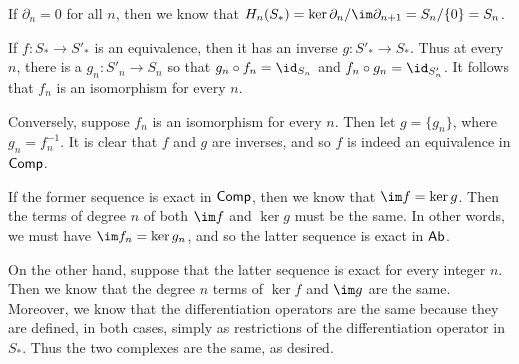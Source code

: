 \documentclass[../../solutions.tex]{subfiles}
\begin{document}
\begin{exercise} \leavevmode
If $\partial_n=0$ for all $n$, then we know that $H_n(S_*)=\ker\partial_n/\im\partial_{n+1}=S_n/\{0\}=S_n$. 
\end{exercise}

\begin{exercise} \leavevmode
If $f:S_*\to S'_*$ is an equivalence, then it has an inverse $g:S'_*\to S_*$. 
Thus at every $n$, there is a $g_n:S'_n\to S_n$ so that $g_n\circ f_n=\id_{S_n}$ and $f_n\circ g_n=\id_{S'_n}$. 
It follows that $f_n$ is an isomorphism for every $n$. 

Conversely, suppose $f_n$ is an isomorphism for every $n$. 
Then let $g=\{g_n\}$, where $g_n=f_n^{-1}$. 
It is clear that $f$ and $g$ are inverses, and so $f$ is indeed an equivalence in $\mathsf{Comp}$. 
\end{exercise}

\begin{exercise} \leavevmode
If the former sequence is exact in $\mathsf{Comp}$, then we know that $\im f=\ker g$. 
Then the terms of degree $n$ of both $\im f$ and $\ker g$ must be the same. 
In other words, we must have $\im f_n=\ker g_n$, and so the latter sequence is exact in $\mathsf{Ab}$. 

On the other hand, suppose that the latter sequence is exact for every integer $n$. 
Then we know that the degree $n$ terms of $\ker f$ and $\im g$ are the same. 
Moreover, we know that the differentiation operators are the same because they are defined, in both cases, simply as restrictions of the differentiation operator in $S_*$. 
Thus the two complexes are the same, as desired. 
\end{exercise}
\end{document}
